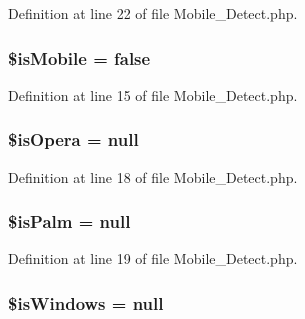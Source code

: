 \-Definition at line 22 of file \-Mobile\-\_\-\-Detect.\-php.

\hypertarget{class_mobile___detect_a74fa6ba88f216ab9fb444f81f8e7a027}{
\subsubsection[{\$is\-Mobile}]{\setlength{\rightskip}{0pt plus 5cm}\${\bf is\-Mobile} = false}}\label{class_mobile___detect_a74fa6ba88f216ab9fb444f81f8e7a027}


\-Definition at line 15 of file \-Mobile\-\_\-\-Detect.\-php.

\hypertarget{class_mobile___detect_aae89458b4937650ddf9ab0a1c60c9388}{
\subsubsection[{\$is\-Opera}]{\setlength{\rightskip}{0pt plus 5cm}\$is\-Opera = null}}\label{class_mobile___detect_aae89458b4937650ddf9ab0a1c60c9388}


\-Definition at line 18 of file \-Mobile\-\_\-\-Detect.\-php.

\hypertarget{class_mobile___detect_a5299625c89989e6d10b38e04bb34463b}{
\subsubsection[{\$is\-Palm}]{\setlength{\rightskip}{0pt plus 5cm}\$is\-Palm = null}}\label{class_mobile___detect_a5299625c89989e6d10b38e04bb34463b}


\-Definition at line 19 of file \-Mobile\-\_\-\-Detect.\-php.

\hypertarget{class_mobile___detect_a3fb1637ec578272acfd5cb10d0f127fd}{
\subsubsection[{\$is\-Windows}]{\setlength{\rightskip}{0pt plus 5cm}\$is\-Windows = null}}\label{class_mobile___detect_a3fb1637ec578272acfd5cb10d0f127fd}


